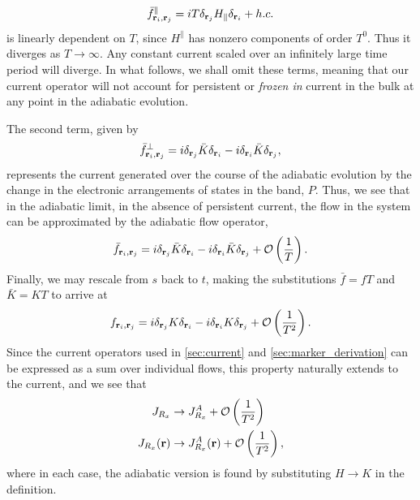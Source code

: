 \begin{align}
    \bar f^\parallel _{\textbf r_i, \textbf r_j} = iT \delta_{\textbf r_j}H_\parallel \delta_{\textbf r_i } + h.c.
\end{align}
is linearly dependent on $T$, since $H^\parallel$ has nonzero components of order $T^0$. Thus it diverges as $T \rightarrow \infty$. Any constant current scaled over an infinitely large time period will diverge. In what follows, we shall omit these terms, meaning that our current operator will not account for persistent or \textit{frozen in} current in the bulk at any point in the adiabatic evolution.\par
The second term, given by
\begin{align}
    \bar f^\perp_{\textbf r_i, \textbf r_j} = i \delta_{\textbf r_j}\bar K\delta_{\textbf r_i }-i\delta_{\textbf r_i}\bar K\delta_{ \textbf r_j },
\end{align}
represents the current generated over the course of the adiabatic evolution by the change in the electronic arrangements of states in the band, $P$. Thus, we see that in the adiabatic limit, in the absence of persistent current, the flow in the system can be approximated by the adiabatic flow operator,
\begin{align}
    \bar f_{\textbf r_i, \textbf r_j} = i \delta_{\textbf r_j}\bar K\delta_{\textbf r_i }-i\delta_{\textbf r_i}\bar K\delta_{ \textbf r_j } + \mathcal O \left( \frac{1}{T} \right ).
\end{align}
Finally, we may rescale from $s$ back to $t$, making the substitutions $\bar f = f T$ and $\bar K = K T$ to arrive at
\begin{align}
    f_{\textbf r_i, \textbf r_j} = i \delta_{\textbf r_j} K\delta_{\textbf r_i }-i\delta_{\textbf r_i} K\delta_{ \textbf r_j } + \mathcal O \left( \frac{1}{T^2} \right ).
\end{align}
Since the current operators used in \textsection \ref{sec:current} and \textsection\ref{sec:marker_derivation} can be expressed as a sum over individual flows, this property naturally extends to the current, and we see that
\begin{align}
    J_{R_x} &\rightarrow J^A_{R_x} + \mathcal O \left( \frac{1}{T^2} \right ) \\
    J_{R_x}(\textbf r) &\rightarrow J^A_{R_x}(\textbf r) + \mathcal O \left( \frac{1}{T^2} \right ),
\end{align}
where in each case, the adiabatic version is found by substituting $H \rightarrow K$ in the definition.
